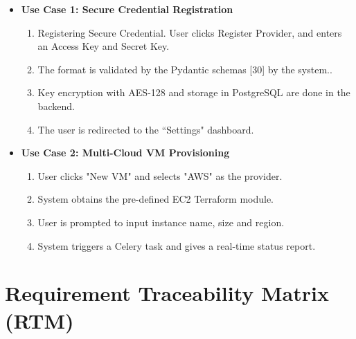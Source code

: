 \begin{itemize}
    \item \textbf{Use Case 1: Secure Credential Registration}
        \begin{enumerate}
            \item Registering Secure Credential. User clicks Register Provider, and enters an Access Key and Secret Key.
            \item The format is validated by the Pydantic schemas [30] by the system.\cite{pydantic_docs}.
            \item Key encryption with AES-128 and storage in PostgreSQL are done in the backend.
            \item The user is redirected to the “Settings" dashboard.
        \end{enumerate}
    \item \textbf{Use Case 2: Multi-Cloud VM Provisioning}
        \begin{enumerate}
            \item User clicks "New VM" and selects "AWS" as the provider.
            \item System obtains the pre-defined EC2 Terraform module.
            \item User is prompted to input instance name, size and region.
            \item System triggers a Celery task and gives a real-time status report.
        \end{enumerate}
\end{itemize}

\section{Requirement Traceability Matrix (RTM)}


